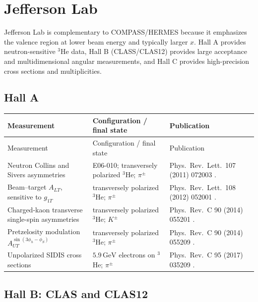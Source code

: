 \documentclass[11pt]{article}
\newcommand{\GeV}{\mathrm{GeV}}
\begin{document}
\section{Jefferson Lab}

Jefferson Lab is complementary to COMPASS/HERMES because it emphasizes the valence region at lower
beam energy and typically larger $x$.  Hall A provides neutron-sensitive $^3$He data, Hall B
(CLASS/CLAS12) provides large acceptance and multidimensional angular measurements, and Hall C
provides high-precision cross sections and multiplicities.

\subsection{Hall A}

\small
\begin{longtable}{@{}p{}p{}p{}@{}}
\toprule
Measurement & Configuration / final state & Publication \\ \midrule
\endfirsthead
\toprule
Measurement & Configuration / final state & Publication \\ \midrule
\endhead
Neutron Collins and Sivers asymmetries &
E06-010; transversely polarized $^3$He; $\pi^\pm$ &
Phys.\ Rev.\ Lett.\ 107 (2011) 072003 \cite{JLABA:CS2011}. \\

Beam--target $A_{LT}$, sensitive to $g_{1T}$ &
transversely polarized $^3$He; $\pi^\pm$ &
Phys.\ Rev.\ Lett.\ 108 (2012) 052001 \cite{JLABA:ALT2012}. \\

Charged-kaon transverse single-spin asymmetries &
transversely polarized $^3$He; $K^\pm$ &
Phys.\ Rev.\ C 90 (2014) 055201 \cite{JLABA:kaon2014}. \\

Pretzelosity modulation $A_{UT}^{\sin(3\phi_h-\phi_S)}$ &
transversely polarized $^3$He; $\pi^\pm$ &
Phys.\ Rev.\ C 90 (2014) 055209 \cite{JLABA:pretzel2014}. \\

Unpolarized SIDIS cross sections &
$5.9\,\GeV$ electrons on $^3$He; $\pi^\pm$ &
Phys.\ Rev.\ C 95 (2017) 035209 \cite{JLABA:unpol2017}. \\
\bottomrule
\end{longtable}
\normalsize

\subsection{Hall B: CLAS and CLAS12}
\end{document}
